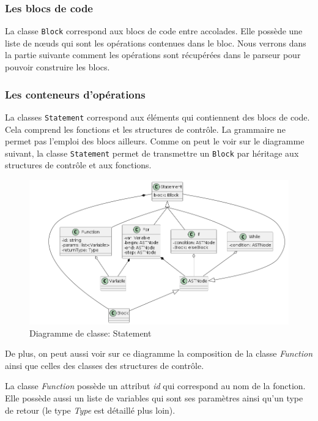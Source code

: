 \documentclass[a4paper]{article}%
\begin{document}
\subsubsection*{Les blocs de code}

La classe \lstinline{Block} correspond aux blocs de code entre accolades.
Elle possède une liste de nœuds qui sont les opérations contenues dans le
bloc. Nous verrons dans la partie suivante comment les opérations sont
récupérées dans le parseur pour pouvoir construire les blocs.

\clearpage{}
\subsubsection*{Les conteneurs d'opérations}

La classes \lstinline{Statement} correspond aux éléments qui contiennent des
blocs de code. Cela comprend les fonctions et les structures de contrôle. La
grammaire ne permet pas l'emploi des blocs ailleurs. Comme on peut le voir sur
le diagramme suivant, la classe \lstinline{Statement} permet de transmettre un
\lstinline{Block} par héritage aux structures de contrôle et aux fonctions.

\begin{figure}[h!]
  \begin{center}
  \includegraphics[scale=0.5]{../ressources/diagrams/stmts.png}
  \caption{Diagramme de classe: Statement}
  \end{center}
\end{figure}

De plus, on peut aussi voir sur ce diagramme la composition de la classe
\textit{Function} ainsi que celles des classes des structures de contrôle.

La classe \textit{Function} possède un attribut \textit{id} qui correspond au nom de la
fonction. Elle possède aussi un liste de variables qui sont ses paramètres ainsi
qu'un type de retour (le type \textit{Type} est détaillé plus loin).
\end{document}
